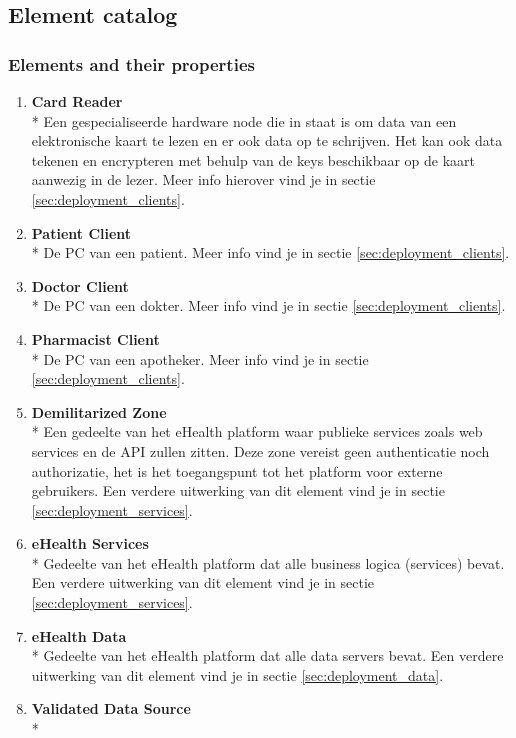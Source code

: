 \documentclass[a4paper,10pt]{article}
\begin{document}
\subsection{Element catalog}

\subsubsection{Elements and their properties}

\begin{enumerate}
\item \textbf{Card Reader}\\*
Een gespecialiseerde hardware node die in staat is om data van een elektronische kaart te lezen en er ook data op te schrijven. Het kan ook data tekenen en encrypteren met behulp van de keys beschikbaar op de kaart aanwezig in de lezer. Meer info hierover vind je in sectie \ref{sec:deployment_clients}.
\item \textbf{Patient Client}\\*
De PC van een patient. Meer info vind je in sectie \ref{sec:deployment_clients}.
\item \textbf{Doctor Client}\\*
De PC van een dokter. Meer info vind je in sectie \ref{sec:deployment_clients}.
\item \textbf{Pharmacist Client}\\*
De PC van een apotheker. Meer info vind je in sectie \ref{sec:deployment_clients}.
\item \textbf{Demilitarized Zone}\\*
Een gedeelte van het eHealth platform waar publieke services zoals web services en de API zullen zitten. Deze zone vereist geen authenticatie noch authorizatie, het is het toegangspunt tot het platform voor externe gebruikers. Een verdere uitwerking van dit element vind je in sectie \ref{sec:deployment_services}.
\item \textbf{eHealth Services}\\*
Gedeelte van het eHealth platform dat alle business logica (services) bevat. Een verdere uitwerking van dit element vind je in sectie \ref{sec:deployment_services}.
\item \textbf{eHealth Data}\\*
Gedeelte van het eHealth platform dat alle data servers bevat. Een verdere uitwerking van dit element vind je in sectie \ref{sec:deployment_data}.
\item \textbf{Validated Data Source}\\*

\end{enumerate}
\end{document}
